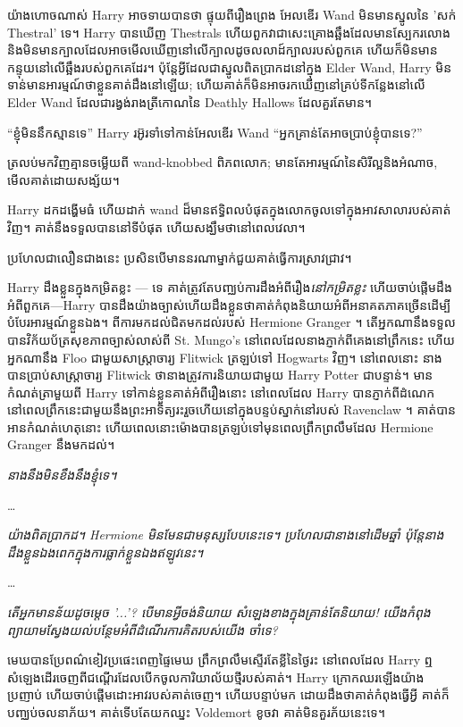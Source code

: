 យ៉ាងហោចណាស់ Harry អាចទាយបានថា ផ្ទុយពីរឿងព្រេង អែលឌើរ Wand មិនមានស្នូលនៃ 'សក់ Thestral' ទេ។ Harry បានឃើញ Thestrals ហើយពួកវាជាសេះគ្រោងឆ្អឹងដែលមានស្បែករលោង និងមិនមានក្បាលដែលអាចមើលឃើញនៅលើក្បាលដូចលលាដ៍ក្បាលរបស់ពួកគេ ហើយក៏មិនមានកន្ទុយនៅលើឆ្អឹងរបស់ពួកគេដែរ។ ប៉ុន្តែអ្វីដែលជាស្នូលពិតប្រាកដនៅក្នុង Elder Wand, Harry មិនទាន់មានអារម្មណ៍ថាខ្លួនគាត់ដឹងនៅឡើយ; ហើយ​គាត់​ក៏​មិន​អាច​រក​ឃើញ​នៅ​គ្រប់​ទី​កន្លែង​នៅ​លើ Elder Wand ដែល​ជា​រង្វង់​រាង​ត្រីកោណ​នៃ Deathly Hallows ដែល​គួរ​តែ​មាន។

“ខ្ញុំមិននឹកស្មានទេ” Harry រអ៊ូរទាំទៅកាន់អែលឌើរ Wand “អ្នកគ្រាន់តែអាចប្រាប់ខ្ញុំបានទេ?”

ត្រលប់មកវិញគ្មានចម្លើយពី wand-knobbed ពិភពលោក; មានតែអារម្មណ៍នៃសិរីល្អនិងអំណាច, មើលគាត់ដោយសង្ស័យ។

Harry ដកដង្ហើមធំ ហើយដាក់ wand ដ៏មានឥទ្ធិពលបំផុតក្នុងលោកចូលទៅក្នុងអាវសាលារបស់គាត់វិញ។ គាត់​នឹង​ទទួល​បាន​នៅ​ទី​បំផុត ហើយ​សង្ឃឹម​ថា​នៅ​ពេល​វេលា។

ប្រហែលជាលឿនជាងនេះ ប្រសិនបើមាននរណាម្នាក់ជួយគាត់ធ្វើការស្រាវជ្រាវ។

Harry ដឹងខ្លួនក្នុងកម្រិតខ្លះ — ទេ គាត់ត្រូវតែបញ្ឈប់ការដឹងអំពីរឿង\emph{នៅកម្រិតខ្លះ} ហើយចាប់ផ្តើមដឹងអំពីពួកគេ—Harry បានដឹងយ៉ាងច្បាស់ហើយដឹងខ្លួនថាគាត់កំពុងនិយាយអំពីអនាគតភាគច្រើនដើម្បីបំបែរអារម្មណ៍ខ្លួនឯង។ ពីការមកដល់ជិតមកដល់របស់ Hermione Granger ។ តើអ្នកណានឹងទទួលបានវិក័យប័ត្រសុខភាពច្បាស់លាស់ពី St. Mungo's នៅពេលដែលនាងភ្ញាក់ពីគេងនៅព្រឹកនេះ ហើយអ្នកណានឹង Floo ជាមួយសាស្រ្តាចារ្យ Flitwick ត្រឡប់ទៅ Hogwarts វិញ។ នៅពេលនោះ នាងបានប្រាប់សាស្រ្តាចារ្យ Flitwick ថានាងត្រូវការនិយាយជាមួយ Harry Potter ជាបន្ទាន់។ មានកំណត់ត្រាមួយពី Harry ទៅកាន់ខ្លួនគាត់អំពីរឿងនោះ នៅពេលដែល Harry បានភ្ញាក់ពីដំណេកនៅពេលព្រឹកនេះជាមួយនឹងព្រះអាទិត្យរះរួចហើយនៅក្នុងបន្ទប់ស្នាក់នៅរបស់ Ravenclaw ។ គាត់​បាន​អាន​កំណត់​ហេតុ​នោះ ហើយ​ពេល​នោះ​ម៉ោង​បាន​ត្រឡប់​ទៅ​មុន​ពេល​ព្រឹក​ព្រលឹម​ដែល Hermione Granger នឹង​មក​ដល់។

\emph{នាងនឹងមិនខឹងនឹងខ្ញុំទេ។}

…

\emph{យ៉ាងពិតប្រាកដ។ Hermione មិនមែនជាមនុស្សបែបនេះទេ។ ប្រហែល​ជា​នាង​នៅ​ដើម​ឆ្នាំ ប៉ុន្តែ​នាង​ដឹង​ខ្លួន​ឯង​ពេក​ក្នុង​ការ​ធ្លាក់​ខ្លួន​ឯង​ឥឡូវ​នេះ។}

…

\emph{តើអ្នកមានន័យដូចម្តេច '...'? បើ​មាន​អ្វី​ចង់​និយាយ សំឡេង​ខាងក្នុង​គ្រាន់តែ​និយាយ! យើងកំពុងព្យាយាមស្វែងយល់បន្ថែមអំពីដំណើរការគិតរបស់យើង ចាំទេ?}

\later

មេឃបានប្រែពណ៌ខៀវប្រផេះពេញផ្ទៃមេឃ ព្រឹកព្រលឹមស្ទើរតែខ្លីនៃថ្ងៃរះ នៅពេលដែល Harry ឮសំឡេងដើរចេញពីជណ្ដើរដែលបើកចូលការិយាល័យថ្មីរបស់គាត់។ Harry ក្រោកឈរឡើងយ៉ាងប្រញាប់ ហើយចាប់ផ្តើមដោះអាវរបស់គាត់ចេញ។ ហើយបន្ទាប់មក ដោយដឹងថាគាត់កំពុងធ្វើអ្វី គាត់ក៏បញ្ឈប់ចលនាភ័យ។ គាត់ទើបតែយកឈ្នះ Voldemort ខូចវា គាត់មិនគួរភ័យនេះទេ។

